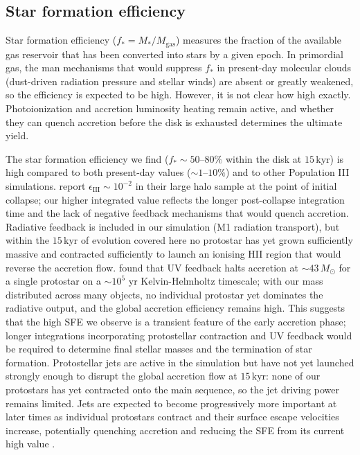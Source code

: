 \documentclass[twocolumn]{openjournal}
\newcommand{\Msun}{M_\odot}
\newcommand{\kyr}{\,\mathrm{kyr}}
\begin{document}
\subsection{Star formation efficiency}

Star formation efficiency ($f_* = M_*/M_\mathrm{gas}$) measures the fraction of the available gas reservoir that has been converted into stars by a given epoch.
In primordial gas, the man mechanisms that would suppress $f_*$ in present-day molecular clouds (dust-driven radiation pressure and stellar winds) are absent or greatly weakened, so the efficiency is expected to be high.
However, it is not clear how high exactly. Photoionization and accretion luminosity heating remain active, and whether they can quench accretion before the disk is exhausted determines the ultimate yield.

The star formation efficiency we find ($f_* \sim 50$--$80\%$ within
the disk at $15\kyr$) is high compared to both present-day values
($\sim 1$--$10\%$) and to other Population III simulations.
\citet{hirano_sakai23} report $\epsilon_\mathrm{III} \sim 10^{-2}$
in their large halo sample at the point of initial collapse; our
higher integrated value reflects the longer post-collapse integration
time and the lack of negative feedback mechanisms that would quench
accretion.
Radiative feedback is included in our simulation (M1 radiation
transport), but within the $15\kyr$ of evolution covered here no
protostar has yet grown sufficiently massive and contracted
sufficiently to launch an ionising H{\small II} region that would
reverse the accretion flow.
\citet{hosokawa11} found that UV feedback halts accretion at
$\sim 43\,\Msun$ for a single protostar on a $\sim 10^5$ yr
Kelvin-Helmholtz timescale; with our mass distributed across
many objects, no individual protostar yet dominates the radiative
output, and the global accretion efficiency remains high.
This suggests that the high SFE we observe is a transient feature of
the early accretion phase; longer integrations incorporating
protostellar contraction and UV feedback would be required to
determine final stellar masses and the termination of star formation.
Protostellar jets are active in the simulation but have not yet
launched strongly enough to disrupt the global accretion flow at
$15\kyr$: none of our protostars has yet contracted onto the main
sequence, so the jet driving power remains limited.
Jets are expected to become progressively more important at later
times as individual protostars contract and their surface escape
velocities increase, potentially quenching accretion and reducing
the SFE from its current high value \citep{STARFORGE_Towa_Grudic_2021,
	meziani26}.
\end{document}
